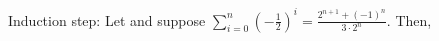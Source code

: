         Induction step: Let  and suppose $\sum^n_{i=0} (-\frac{1}{2})^i=\frac{2^{n+1}+(-1)^n}{3\cdot 2^n}$.
        Then, 